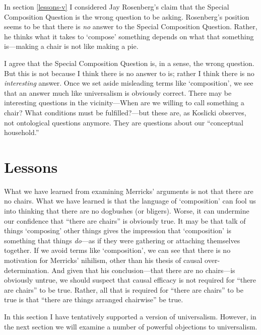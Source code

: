 \documentclass[11pt]{article}
\begin{document}
\begin{spacing}{1.25}
In section \ref{lessons-v} I considered Jay Rosenberg's claim that
the Special Composition Question is the wrong question to be asking.
Rosenberg's position seems to be that there is {\em no} answer to the
Special Composition Question.  Rather, he thinks what it takes to
`compose' something depends on what that something is---making a chair
is not like making a pie.

I agree that the Special Composition Question is, in a sense, the
wrong question.  But this is not because I think there is no answer to
is; rather I think there is no {\em interesting} answer.  Once we set
aside misleading terms like `composition', we see that an answer much
like universalism is obviously correct.  There may be interesting
questions in the vicinity---When are we willing to call something a
chair?  What conditions must be fulfilled?---but these are, as
Koslicki observes, not ontological questions anymore.  They are
questions about our ``conceptual household.''

\section{Lessons}
What we have learned from examining Merricks' arguments is not that
there are no chairs.  What we have learned is that the language of
`composition' can fool us into thinking that there are no dogbushes
(or bligers).  Worse, it can undermine our confidence that ``there are
chairs'' is obviously true.  It may be that talk of things `composing'
other things gives the impression that `composition' is something that
things {\em do}---as if they were gathering or attaching themselves
together.  If we avoid terms like `composition', we can see that there
is no motivation for Merricks' nihilism, other than his thesis of
causal over-determination.  And given that his conclusion---that there
are no chairs---is obviously untrue, we should suspect that causal
efficacy is not required for ``there are chairs'' to be true.  Rather,
all that is required for ``there are chairs'' to be true is that
``there are things arranged chairwise'' be true.

In this section I have tentatively supported a version of
universalism.  However, in the next section we will examine a number
of powerful objections to universalism.

\ifstandalone
\end{spacing}


\fi
\end{document}
